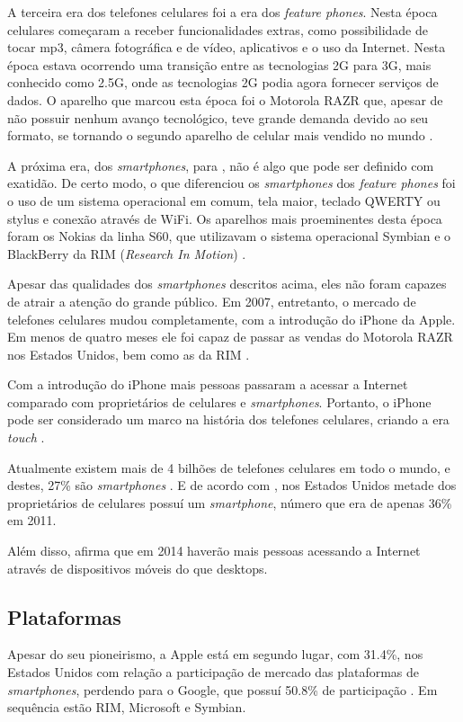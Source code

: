 \documentclass[diss]{template/setrem}
\begin{document}
A terceira era dos telefones celulares foi a era dos \emph{feature phones}. Nesta época celulares começaram a receber funcionalidades extras, como possibilidade de tocar mp3, câmera fotográfica e de vídeo, aplicativos e o uso da Internet. Nesta época estava ocorrendo uma transição entre as tecnologias 2G para 3G, mais conhecido como 2.5G, onde as tecnologias 2G podia agora fornecer serviços de dados. O aparelho que marcou esta época foi o Motorola RAZR que, apesar de não possuir nenhum avanço tecnológico, teve grande demanda devido ao seu formato, se tornando o segundo aparelho de celular mais vendido no mundo \citep{Fling2009}.

A próxima era, dos \emph{smartphones}, para \citet{Fling2009}, não é algo que pode ser definido com exatidão. De certo modo, o que diferenciou os \emph{smartphones} dos \emph{feature phones} foi o uso de um sistema operacional em comum, tela maior, teclado QWERTY ou stylus e conexão através de WiFi. Os aparelhos mais proeminentes desta época foram os Nokias da linha S60, que utilizavam o sistema operacional Symbian e o BlackBerry da RIM (\emph{Research In Motion}) \citep{Fling2009}.

Apesar das qualidades dos \emph{smartphones} descritos acima, eles não foram capazes de atrair a atenção do grande público. Em 2007, entretanto, o mercado de telefones celulares mudou completamente, com a introdução do iPhone da Apple. Em menos de quatro meses ele foi capaz de passar as vendas do Motorola RAZR nos Estados Unidos, bem como as da RIM \citep{Fling2009}.

Com a introdução do iPhone mais pessoas passaram a acessar a Internet comparado com proprietários de celulares e \emph{smartphones}. Portanto, o iPhone pode ser considerado um marco na história dos telefones celulares, criando a era \emph{touch} \citep{Fling2009}.

Atualmente existem mais de 4 bilhões de telefones celulares em todo o mundo, e destes, 27\% são \emph{smartphones} \citep{Richmond2011}. E de acordo com \citet{Nielsen2012}, nos Estados Unidos metade dos proprietários de celulares possuí um \emph{smartphone}, número que era de apenas 36\% em 2011.

Além disso, \citet{MorganStanley2010} afirma que em 2014 haverão mais pessoas acessando a Internet através de dispositivos móveis do que desktops.

\subsection{Plataformas}
Apesar do seu pioneirismo, a Apple está em segundo lugar, com 31.4\%, nos Estados Unidos com relação a participação de mercado das plataformas de \emph{smartphones}, perdendo para o Google, que possuí 50.8\% de participação \citep{comScore2012}. Em sequência estão RIM, Microsoft e Symbian.
\end{document}
